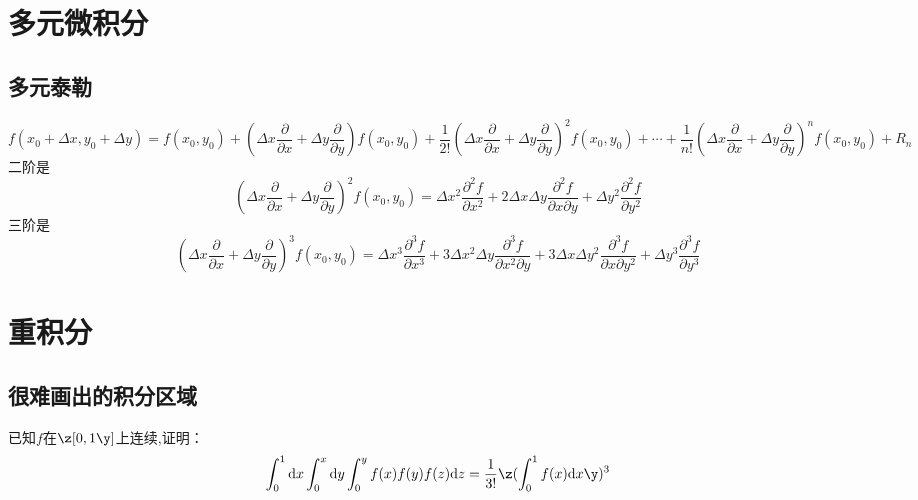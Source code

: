\chapter{多元微积分}

\section{多元泰勒}

\[
f(x_0 + \Delta x, y_0 + \Delta y) 
= f(x_0, y_0) 
+ \left( \Delta x \frac{\partial}{\partial x} + \Delta y \frac{\partial}{\partial y} \right) f(x_0, y_0) 
+ \frac{1}{2!} \left( \Delta x \frac{\partial}{\partial x} + \Delta y \frac{\partial}{\partial y} \right)^2 f(x_0, y_0) 
+ \cdots 
+ \frac{1}{n!} \left( \Delta x \frac{\partial}{\partial x} + \Delta y \frac{\partial}{\partial y} \right)^n f(x_0, y_0) 
+ R_n
\]
二阶是
\[ \left( \Delta x \frac{\partial}{\partial x} + \Delta y \frac{\partial}{\partial y} \right)^2 f(x_0, y_0)
= \Delta x^2 \frac{\partial^2 f}{\partial x^2} + 2 \Delta x \Delta y \frac{\partial^2 f}{\partial x \partial y} + \Delta y^2 \frac{\partial^2 f}{\partial y^2} \]
三阶是
  \[ \left( \Delta x \frac{\partial}{\partial x} + \Delta y \frac{\partial}{\partial y} \right)^3 f(x_0, y_0)
= \Delta x^3 \frac{\partial^3 f}{\partial x^3} + 3 \Delta x^2 \Delta y \frac{\partial^3 f}{\partial x^2 \partial y} + 3 \Delta x \Delta y^2 \frac{\partial^3 f}{\partial x \partial y^2} + \Delta y^3 \frac{\partial^3 f}{\partial y^3} \]
 




\chapter{重积分}

\section{很难画出的积分区域}

\begin{example}[紫皮书6.2习题]
已知$f$在$\z[0,1\y]$上连续,证明：
\[ \int_{0}^{1}\mathrm{d} x\int_{0}^{x}\mathrm{d} y\int_{0}^{y}f(x)f(y)f(z)\mathrm{d}z = \frac{1}{3!}\z(\int_{0}^{1}f(x)\mathrm{d}x\y)^3\]
\end{example}

